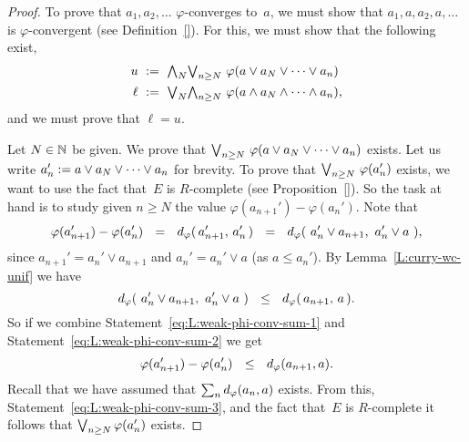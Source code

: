 \documentclass[main.tex]{subfiles}
\begin{document}
\begin{proof}
To prove that $a_1,a_2,\dotsc$ $\varphi$-converges to~$a$,
we must show that $a_1,a,a_2,a,\dotsc$ is $\varphi$-convergent
(see Definition~\ref{}).
For this, 
we must show that the following exist,
\begin{alignat*}{3}
u \ &:=\  \textstyle{\bigwedge}_N \textstyle{\bigvee}_{n\geq N} \ \varphi(a \vee a_N \vee \dotsb \vee a_n)\\
\ell \ &:=\  
\textstyle{\bigvee}_N \textstyle{\bigwedge}_{n\geq N} \ \varphi(a \wedge a_N \wedge \dotsb \wedge a_n),
\end{alignat*}
and we must prove that $\ell = u$.

Let $N\in \mathbb{N}$ be given.
We prove that $\textstyle{\bigvee}_{n\geq N} \ \varphi(a\vee a_N \vee \dotsb \vee a_n)$ exists.
Let us write $a_n ' := a\vee a_N \vee \dotsb \vee a_n$
for brevity. 
 To prove that $\bv_{n\geq N} \ \varphi(a_n')$ exists,
we want to use the fact that~$E$ is $R$-complete
(see Proposition~\ref{}).
So the task at hand is to study given $n\geq N$ the 
value $\varphi(a_{n+1}') - \varphi(a_n')$. Note that
\begin{equation}
\label{eq:L:weak-phi-conv-sum-1}
\varphi(a_{n+1}') - \varphi(a_n')
\ \ =\  \ d_{\smash{\varphi}}(\,a_{n+1}',\,a_n'\,)
\ \ =\ \ d_{\smash{\varphi}}(\ a_{n}'\vee a_{n+1},\  a_n'\vee a\ ),
\end{equation}
since $a_{n+1}' = a_{n}'\vee a_{n+1}$
and $a_n' = a_n'\vee a $ (as $a\leq a_n'$).
By Lemma~\ref{L:curry-wc-unif} we have
\begin{equation}
\label{eq:L:weak-phi-conv-sum-2}
\ld\varphi(\ a_n' \vee a_{n+1},\ a_n' \vee a\ )
\ \ \leq\ \ 
\ld\varphi(\,a_{n+1},\,a\,).
\end{equation}
So if we combine Statement~\eqref{eq:L:weak-phi-conv-sum-1}
and Statement~\eqref{eq:L:weak-phi-conv-sum-2}
we get 
\begin{equation}
\label{eq:L:weak-phi-conv-sum-3}
\varphi(a_{n+1}') - \varphi(a_n')
\ \ \leq\ \ 
\ld\varphi(a_{n+1},a).
\end{equation}
Recall that we have assumed that $\sum_n d_{\smash{\varphi}}(a_n,a)$ exists.
From this,
Statement~\eqref{eq:L:weak-phi-conv-sum-3},
and the fact that~$E$ is $R$-complete
it follows that $\textstyle{\bigvee}_{n\geq N} \,\varphi(a_n')$ exists.


\end{proof}
\end{document}

